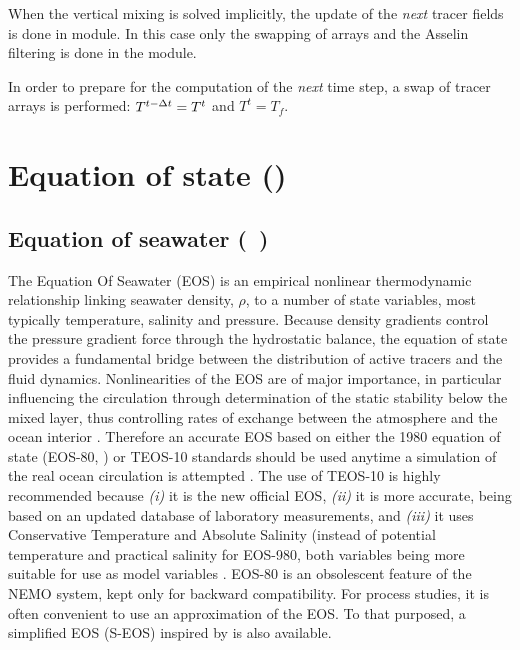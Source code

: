 \documentclass[../main/NEMO_manual]{subfiles}
\begin{document}
When the vertical mixing is solved implicitly, the update of the \textit{next} tracer fields is done in
 module.
In this case only the swapping of arrays and the Asselin filtering is done in the  module.

In order to prepare for the computation of the \textit{next} time step, a swap of tracer arrays is performed:
$T^{t - \Delta t} = T^t$ and $T^t = T_f$.

\section{Equation of state (\protect{}) }
\label{sec:TRA_eosbn2}


\subsection{Equation of seawater (\protect{}~)}
\label{subsec:TRA_eos}

The Equation Of Seawater (EOS) is an empirical nonlinear thermodynamic relationship linking seawater density,
$\rho$, to a number of state variables, most typically temperature, salinity and pressure.
Because density gradients control the pressure gradient force through the hydrostatic balance,
the equation of state provides a fundamental bridge between the distribution of active tracers and
the fluid dynamics.
Nonlinearities of the EOS are of major importance, in particular influencing the circulation through
determination of the static stability below the mixed layer,
thus controlling rates of exchange between the atmosphere and the ocean interior \citep{Roquet_JPO2015}.
Therefore an accurate EOS based on either the 1980 equation of state (EOS-80, \cite{UNESCO1983}) or
TEOS-10 \citep{TEOS10} standards should be used anytime a simulation of the real ocean circulation is attempted
\citep{Roquet_JPO2015}.
The use of TEOS-10 is highly recommended because
\textit{(i)}   it is the new official EOS,
\textit{(ii)}  it is more accurate, being based on an updated database of laboratory measurements, and
\textit{(iii)} it uses Conservative Temperature and Absolute Salinity (instead of potential temperature and
practical salinity for EOS-980, both variables being more suitable for use as model variables
\citep{TEOS10, Graham_McDougall_JPO13}.
EOS-80 is an obsolescent feature of the NEMO system, kept only for backward compatibility.
For process studies, it is often convenient to use an approximation of the EOS.
To that purposed, a simplified EOS (S-EOS) inspired by \citet{Vallis06} is also available.
\end{document}
